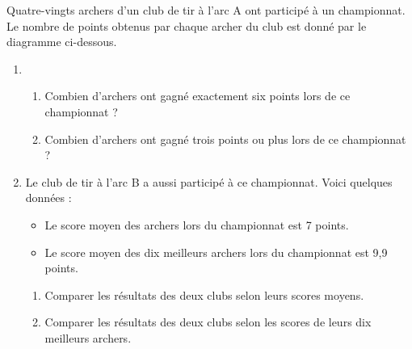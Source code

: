\begin{Maquette}[Fiche,CorrigeFin,Colonnes=2]{}
\begin{multicols}{2}
      \begin{exercice} %
         Quatre-vingts archers d'un club de tir à l'arc A ont participé à un championnat. Le nombre de points obtenus par chaque archer du club est donné par le diagramme ci-dessous. \par \medskip
         {\footnotesize      
          }
         \vspace*{-5mm}
         \begin{enumerate}
            \item 
               \begin{enumerate}
                  \item Combien d'archers ont gagné exactement six points lors de ce championnat ?
                  \item Combien d'archers ont gagné trois points ou plus lors de ce championnat ?
               \end{enumerate}
            \item Le club de tir à l'arc B a aussi participé à ce championnat. Voici quelques données :
               \begin{itemize}
                  \item Le score moyen des archers lors du championnat est 7 points.
                  \item Le score moyen des dix meilleurs archers lors du championnat est 9,9 points.
               \end{itemize}
               \begin{enumerate}
                  \item Comparer les résultats des deux clubs selon leurs scores moyens.
                  \item Comparer les résultats des deux clubs selon les scores de leurs dix meilleurs archers.
               \end{enumerate}
         \end{enumerate}
      \end{exercice}


\end{multicols}
\end{Maquette}
